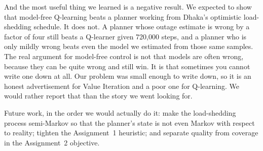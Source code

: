 \documentclass{ai-lab-report}
\begin{document}
And the most useful thing we learned is a negative result. We expected to show that model-free
Q-learning beats a planner working from Dhaka's optimistic load-shedding schedule. It does not.
A planner whose outage estimate is wrong by a factor of four still beats a Q-learner given
720,000 steps, and a planner who is only mildly wrong beats even the model we estimated from
those same samples. The real argument for model-free control is not that models are often wrong,
because they can be quite wrong and still win. It is that sometimes you cannot write one down at
all. Our problem was small enough to write down, so it is an honest advertisement for Value
Iteration and a poor one for Q-learning. We would rather report that than the story we went
looking for.

Future work, in the order we would actually do it: make the load-shedding process semi-Markov so
that the planner's state is not even Markov with respect to reality; tighten the Assignment~1
heuristic; and separate quality from coverage in the Assignment~2 objective.



\end{document}
